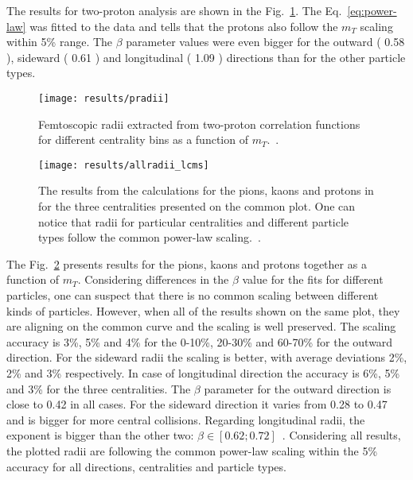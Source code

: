       The results for two-proton analysis are shown in the Fig.~\ref{fig:pradii}.
      The Eq.~\ref{eq:power-law} was fitted to the data and tells that the protons also follow the $m_T$ scaling within 5\% range.
      The $\beta$ parameter values were even bigger for the outward ( 0.58 ), sideward ( 0.61 ) and longitudinal ( 1.09 ) directions than for the other particle types. 

      \begin{figure}[b]
        \centering
        \centerline{\texttt{[image: results/pradii]}}
        \caption{Femtoscopic radii extracted from two-proton correlation functions for different centrality bins as a function of $m_T$.~\cite{galazyn}.}
      \label{fig:pradii}
      \end{figure}

      \begin{figure}[b]
        \centering
        \centerline{\texttt{[image: results/allradii\_lcms]}}
        \caption{The results from the calculations for the pions, kaons and protons in for the three centralities presented on the common plot. One can notice that radii for particular centralities and different particle types follow the common power-law scaling.~\cite{galazyn}.}
      \label{fig:allradii}
      \end{figure}    

      The Fig.~\ref{fig:allradii} presents results for the pions, kaons and protons together as a function of $m_T$.
      Considering differences in the $\beta$ value for the fits for different particles, one can suspect that there is no common scaling between different kinds of particles.
      However, when all of the results shown on the same plot, they are aligning on the common curve and the scaling is well preserved.
      The scaling accuracy is 3\%, 5\% and 4\% for the 0-10\%, 20-30\% and 60-70\% for the outward direction.
      For the sideward radii the scaling is better, with average deviations 2\%, 2\% and 3\% respectively.
      In case of longitudinal direction the accuracy is 6\%, 5\% and 3\% for the three centralities.
      The $\beta$ parameter for the outward direction is close to 0.42 in all cases.
      For the sideward direction it varies from 0.28 to 0.47 and is bigger for more central collisions.
      Regarding longitudinal radii, the exponent is bigger than the other two: $\beta \in [0.62 ; 0.72]$~.
      Considering all results, the plotted radii are following the common power-law scaling within the 5\% accuracy for all directions, centralities and particle types.
      \FloatBarrier
